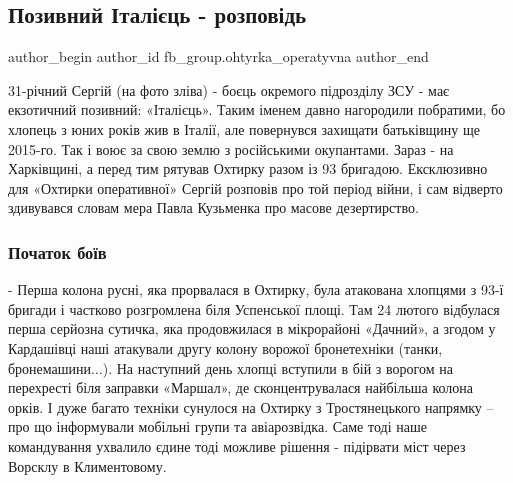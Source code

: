 
 
 
 
 
 
\subsection{Позивний Італієць - розповідь}
\label{sec:22_05_2022.fb.fb_group.ohtyrka_operatyvna.1.pozyvnyj_italiec}
 
\ifcmt
 author_begin
   author_id fb_group.ohtyrka_operatyvna
 author_end
\fi


31-річний Сергій (на фото зліва) - боєць окремого підрозділу ЗСУ - має
екзотичний позивний: «Італієць». Таким іменем давно нагородили побратими, бо
хлопець з юних років жив в Італії, але повернувся захищати батьківщину ще
2015-го. Так і воює за свою землю з російськими окупантами. Зараз - на
Харківщині, а перед тим рятував Охтирку разом із 93 бригадою. Ексклюзивно для
«Охтирки оперативної» Сергій розповів про той період війни, і сам відверто
здивувався словам мера Павла Кузьменка про масове дезертирство.

\subsubsection{Початок боїв}

- Перша колона русні, яка прорвалася в Охтирку, була атакована хлопцями з 93-ї
бригади і частково розгромлена біля Успенської площі. Там 24 лютого відбулася
перша серйозна сутичка, яка продовжилася в мікрорайоні «Дачний», а згодом у
Кардашівці наші атакували другу колону ворожої бронетехніки (танки,
бронемашини...). На наступний день хлопці вступили в бій з ворогом на
перехресті біля заправки «Маршал», де сконцентрувалася найбільша колона орків.
І дуже багато техніки сунулося на Охтирку з Тростянецького напрямку – про що
інформували мобільні групи та авіарозвідка. Саме тоді наше командування
ухвалило єдине тоді можливе рішення - підірвати міст через Ворсклу в
Климентовому.


